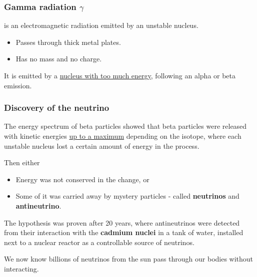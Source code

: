 \subsubsection*{Gamma radiation $\gamma$}
is an electromagnetic radiation emitted by an unstable nucleus.
\begin{itemize}
    \item Passes through thick metal plates.
    \item Has no mass and no charge.
\end{itemize}
It is emitted by a \underline{nucleus with too much energy}, following an alpha or beta emission.

\subsubsection*{Discovery of the neutrino}

The energy spectrum of beta particles showed that beta particles were released with kinetic energies \underline{up to a maximum} depending on the isotope, where each unstable nucleus lost a certain amount of energy in the process.

Then either
\begin{itemize}
    \item Energy was not conserved in the change, or
    \item Some of it was carried away by mystery particles - called \textbf{neutrinos} and \textbf{antineutrino}.
\end{itemize}

The hypothesis was proven after 20 years, where antineutrinos were detected from their interaction with the \textbf{cadmium nuclei} in a tank of water, installed next to a nuclear reactor as a controllable source of neutrinos.

We now know billions of neutrinos from the sun pass through our bodies without interacting.
